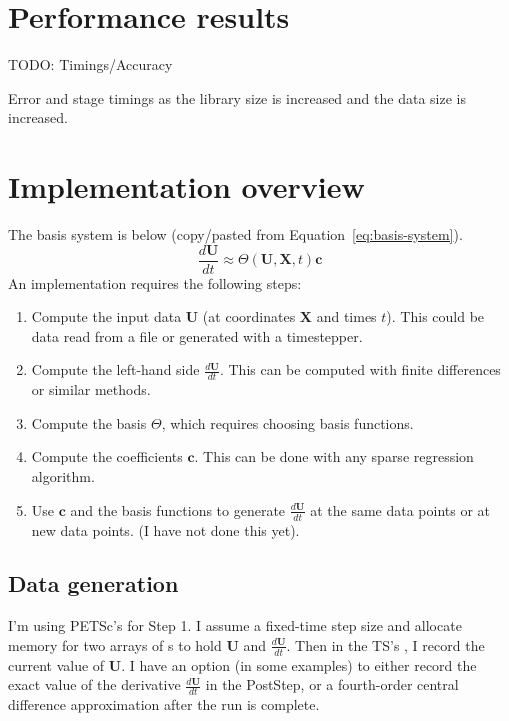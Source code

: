 \documentclass{article}
\let\vec\mathbf
\def\lstinline#1{}%
\begin{document}
\section{Performance results}

TODO: Timings/Accuracy

Error and stage timings as the library size is increased and the data size is increased.


\section{Implementation overview}

The basis system is below (copy/pasted from Equation~\ref{eq:basis-system}).
\begin{equation}
\frac{d\vec{U}}{dt} \approx \Theta(\vec{U}, \vec{X}, t) \vec{c}
\end{equation}
An implementation requires the following steps:
\begin{enumerate}
    \item Compute the input data $\vec{U}$ (at coordinates $\vec{X}$ and times $t$). This could be data read from a file or generated with a timestepper.
    \item Compute the left-hand side $\frac{d\vec{U}}{dt}$. This can be computed with finite differences or similar methods.
    \item Compute the basis $\Theta$, which requires choosing basis functions.
    \item Compute the coefficients $\vec{c}$. This can be done with any sparse regression algorithm.
    \item Use $\vec{c}$ and the basis functions to generate $\frac{d\vec{U}}{dt}$ at the same data points or at new data points. (I have not done this yet).
\end{enumerate}

\subsection{Data generation}

I'm using PETSc's \lstinline{TS} for Step 1. I assume a fixed-time step size and
allocate memory for two arrays of \lstinline{Vec}s to hold $\vec{U}$ and
$\frac{d\vec{U}}{dt}$. Then in the TS's \lstinline{PostStep}, I record the
current value of $\vec{U}$. I have an option (in some examples) to either record
the exact value of the derivative $\frac{d\vec{U}}{dt}$ in the PostStep, or a
fourth-order central difference approximation after the run is complete.
\end{document}
